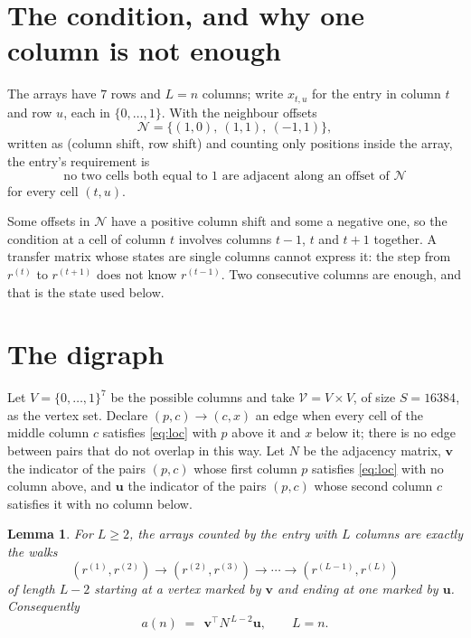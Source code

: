 \documentclass[11pt,a4paper]{article}
\theoremstyle{plain}
\newtheorem{lemma}[theorem]{Lemma}
\theoremstyle{definition}
\begin{document}
\section{The condition, and why one column is not enough}

The arrays have $7$ rows and $L=n$ columns; write $x_{t,u}$ for the entry in
column $t$ and row $u$, each in $\{0,\dots,1\}$. With the neighbour offsets
\[
\mathcal N=\{(1,0),\ (1,1),\ (-1,1)\},
\]
written as (column shift, row shift) and counting only positions inside the array, the
entry's requirement is
\begin{equation}\label{eq:loc}
\text{no two cells both equal to }1\text{ are adjacent along an offset of }\mathcal N
\end{equation}
for every cell $(t,u)$.

Some offsets in $\mathcal N$ have a positive column shift and some a negative one, so the
condition at a cell of column $t$ involves columns $t-1$, $t$ and $t+1$ together. A transfer
matrix whose states are single columns cannot express it: the step from $r^{(t)}$ to
$r^{(t+1)}$ does not know $r^{(t-1)}$. Two consecutive columns are enough, and that is
the state used below.

\section{The digraph}

Let $V=\{0,\dots,1\}^{7}$ be the possible columns and take
$\mathcal V=V\times V$, of size $S=16384$, as the vertex set. Declare $(p,c)\to(c,x)$ an edge
when every cell of the middle column $c$ satisfies \eqref{eq:loc} with $p$ above it and $x$
below it; there is no edge between pairs that do not overlap in this way. Let $N$ be the
adjacency matrix, $\mathbf{v}$ the indicator of the pairs $(p,c)$ whose first column $p$
satisfies \eqref{eq:loc} with no column above, and $\mathbf{u}$ the indicator of
the pairs $(p,c)$ whose second column $c$ satisfies it with no column below.

\begin{lemma}\label{lem:walk}
For $L\ge2$, the arrays counted by the entry with $L$ columns are exactly the walks
\[
(r^{(1)},r^{(2)})\to(r^{(2)},r^{(3)})\to\cdots\to(r^{(L-1)},r^{(L)})
\]
of length $L-2$ starting at a vertex marked by $\mathbf{v}$ and ending at one marked by
$\mathbf{u}$. Consequently
\[
a(n)\;=\;\,\mathbf{v}^{\!\top}N^{\,L-2}\mathbf{u},\qquad L=n .
\]
\end{lemma}
\end{document}
